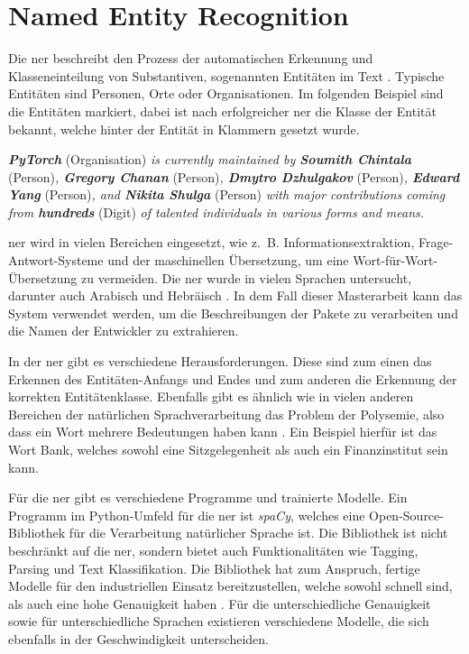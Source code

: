 \section{Named Entity Recognition}
\label{sec:named-entity-recognition}
Die \gls{ner} beschreibt den Prozess der automatischen Erkennung und Klasseneinteilung von Substantiven, sogenannten Entitäten im Text \autocite{mohit_named_2014}.
Typische Entitäten sind Personen, Orte oder Organisationen.
Im folgenden Beispiel sind die Entitäten markiert, dabei ist nach erfolgreicher \gls{ner} die Klasse der Entität bekannt, welche hinter der Entität in Klammern gesetzt wurde.

\begin{addmargin}[25pt]{0pt}
    \emph{\textbf{PyTorch}} (Organisation) \emph{is currently maintained by \textbf{Soumith Chintala}} (Person)\emph{, \textbf{Gregory Chanan}} (Person)\emph{, \textbf{Dmytro Dzhulgakov}} (Person)\emph{, \textbf{Edward Yang}} (Person)\emph{, and \textbf{Nikita Shulga}} (Person) \emph{with major contributions coming from \textbf{hundreds}} (Digit) \emph{of talented individuals in various forms and means.}
\end{addmargin}

\gls{ner} wird in vielen Bereichen eingesetzt, wie z.~B. Informationsextraktion, Frage-Antwort-Systeme und der maschinellen Übersetzung, um eine Wort-für-Wort-Übersetzung zu vermeiden.
Die \gls{ner} wurde in vielen Sprachen untersucht, darunter auch Arabisch und Hebräisch \autocite{mohit_named_2014}.
In dem Fall dieser Masterarbeit kann das System verwendet werden, um die Beschreibungen der Pakete zu verarbeiten und die Namen der Entwickler zu extrahieren.

In der \gls{ner} gibt es verschiedene Herausforderungen.
Diese sind zum einen das Erkennen des Entitäten-Anfangs und Endes und zum anderen die Erkennung der korrekten Entitätenklasse.
Ebenfalls gibt es ähnlich wie in vielen anderen Bereichen der natürlichen Sprachverarbeitung das Problem der Polysemie, also dass ein Wort mehrere Bedeutungen haben kann \autocite{mohit_named_2014}.
Ein Beispiel hierfür ist das Wort \glqq Bank\grqq{}, welches sowohl eine Sitzgelegenheit als auch ein Finanzinstitut sein kann.

Für die \gls{ner} gibt es verschiedene Programme und trainierte Modelle.
Ein Programm im Python-Umfeld für die \gls{ner} ist \emph{spaCy}, welches eine Open-Source-Bibliothek für die Verarbeitung natürlicher Sprache ist.
Die Bibliothek ist nicht beschränkt auf die \gls{ner}, sondern bietet auch Funktionalitäten wie Tagging, Parsing und Text Klassifikation.
Die Bibliothek hat zum Anspruch, fertige Modelle für den industriellen Einsatz bereitzustellen, welche sowohl schnell sind, als auch eine hohe Genauigkeit haben \autocite{honnibal_spacy_2024}.
Für die unterschiedliche Genauigkeit sowie für unterschiedliche Sprachen existieren verschiedene Modelle, die sich ebenfalls in der Geschwindigkeit unterscheiden.
